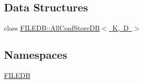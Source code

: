 \subsection*{Data Structures}
\begin{DoxyCompactItemize}
\item 
class \mbox{\hyperlink{classFILEDB_1_1AllConfStoreDB}{F\+I\+L\+E\+D\+B\+::\+All\+Conf\+Store\+D\+B$<$ K, D $>$}}
\end{DoxyCompactItemize}
\subsection*{Namespaces}
\begin{DoxyCompactItemize}
\item 
 \mbox{\hyperlink{namespaceFILEDB}{F\+I\+L\+E\+DB}}
\end{DoxyCompactItemize}

